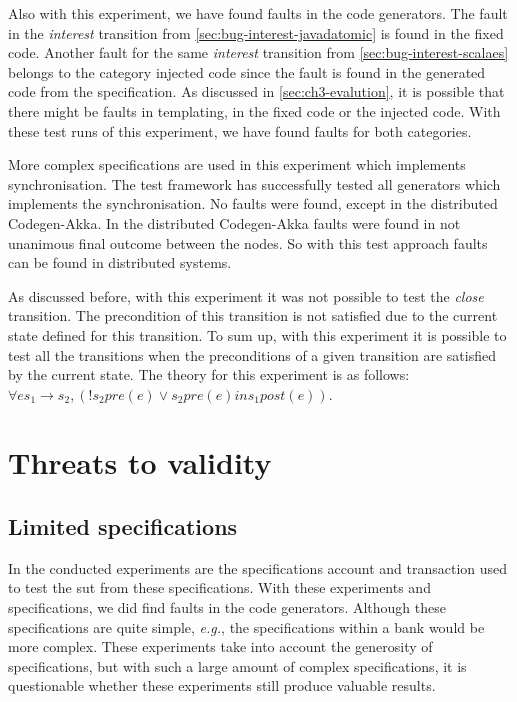 Also with this experiment, we have found faults in the code generators. The fault
in the \textit{interest} transition from \autoref{sec:bug-interest-javadatomic} is found
in the fixed code. Another fault for the same \textit{interest} transition from
\autoref{sec:bug-interest-scalaes} belongs to the category injected code since
the fault is found in the generated code from the specification. As discussed in
\autoref{sec:ch3-evalution}, it is possible that there might be faults in
templating, in the fixed code or the injected code. With these test runs of this
experiment, we have found faults for both categories.

More complex specifications are used in this experiment which implements
synchronisation.
The test framework has successfully tested all generators which
implements the synchronisation. No faults were found, except in the distributed
Codegen-Akka. In the distributed Codegen-Akka faults were found in not unanimous
final outcome between the nodes. So with this test approach faults can be found
in distributed systems.

As discussed before, with this experiment it was not possible to test the
\textit{close} transition. The precondition of this transition is not
satisfied due to the current state defined for this transition. To sum up, with
this experiment it is possible to test all the transitions when the
preconditions of a given transition are satisfied by the current state. The
theory for this experiment is as follows:
$\forall e s_{1} \to s_{2}, (! s_{2} pre(e) \lor s_{2} pre(e) in s_{1} post(e))$.

\section{Threats to validity}

\subsection*{Limited specifications}
In the conducted experiments are the specifications account and transaction used
to test the \gls{sut} from these specifications. With these experiments
and specifications, we did find faults in the code generators. Although
these specifications are quite simple, \textit{e.g.}, the specifications within
a bank would be more complex. These experiments take into account the
generosity of specifications, but with such a large amount of complex
specifications, it is questionable whether these experiments still produce
valuable results.

